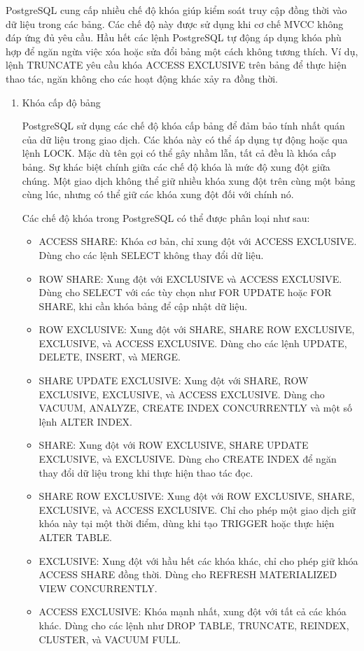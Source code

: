 PostgreSQL cung cấp nhiều chế độ khóa giúp kiểm soát truy cập đồng thời vào dữ liệu trong các bảng. Các chế độ này được sử dụng khi cơ chế MVCC không đáp ứng đủ yêu cầu. Hầu hết các lệnh PostgreSQL tự động áp dụng khóa phù hợp để ngăn ngừa việc xóa hoặc sửa đổi bảng một cách không tương thích. Ví dụ, lệnh TRUNCATE yêu cầu khóa ACCESS EXCLUSIVE trên bảng để thực hiện thao tác, ngăn không cho các hoạt động khác xảy ra đồng thời.
\begin{enumerate}
    \item Khóa cấp độ bảng

    \hspace{1cm}PostgreSQL sử dụng các chế độ khóa cấp bảng để đảm bảo tính nhất quán của dữ liệu trong giao dịch. Các khóa này có thể áp dụng tự động hoặc qua lệnh LOCK. Mặc dù tên gọi có thể gây nhầm lẫn, tất cả đều là khóa cấp bảng. Sự khác biệt chính giữa các chế độ khóa là mức độ xung đột giữa chúng. Một giao dịch không thể giữ nhiều khóa xung đột trên cùng một bảng cùng lúc, nhưng có thể giữ các khóa xung đột đối với chính nó.

    \hspace{1cm}Các chế độ khóa trong PostgreSQL có thể được phân loại như sau:
    \begin{itemize}
        \item ACCESS SHARE: Khóa cơ bản, chỉ xung đột với ACCESS EXCLUSIVE. Dùng cho các lệnh SELECT không thay đổi dữ liệu.
        \item ROW SHARE: Xung đột với EXCLUSIVE và ACCESS EXCLUSIVE. Dùng cho SELECT với các tùy chọn như FOR UPDATE hoặc FOR SHARE, khi cần khóa bảng để cập nhật dữ liệu.
        \item ROW EXCLUSIVE: Xung đột với SHARE, SHARE ROW EXCLUSIVE, EXCLUSIVE, và ACCESS EXCLUSIVE. Dùng cho các lệnh UPDATE, DELETE, INSERT, và MERGE.
        \item SHARE UPDATE EXCLUSIVE: Xung đột với SHARE, ROW EXCLUSIVE, EXCLUSIVE, và ACCESS EXCLUSIVE. Dùng cho VACUUM, ANALYZE, CREATE INDEX CONCURRENTLY và một số lệnh ALTER INDEX.
        \item SHARE: Xung đột với ROW EXCLUSIVE, SHARE UPDATE EXCLUSIVE, và EXCLUSIVE. Dùng cho CREATE INDEX để ngăn thay đổi dữ liệu trong khi thực hiện thao tác đọc.
        \item SHARE ROW EXCLUSIVE: Xung đột với ROW EXCLUSIVE, SHARE, EXCLUSIVE, và ACCESS EXCLUSIVE. Chỉ cho phép một giao dịch giữ khóa này tại một thời điểm, dùng khi tạo TRIGGER hoặc thực hiện ALTER TABLE.
        \item EXCLUSIVE: Xung đột với hầu hết các khóa khác, chỉ cho phép giữ khóa ACCESS SHARE đồng thời. Dùng cho REFRESH MATERIALIZED VIEW CONCURRENTLY.
        \item ACCESS EXCLUSIVE: Khóa mạnh nhất, xung đột với tất cả các khóa khác. Dùng cho các lệnh như DROP TABLE, TRUNCATE, REINDEX, CLUSTER, và VACUUM FULL.
    \end{itemize}


\end{enumerate}
